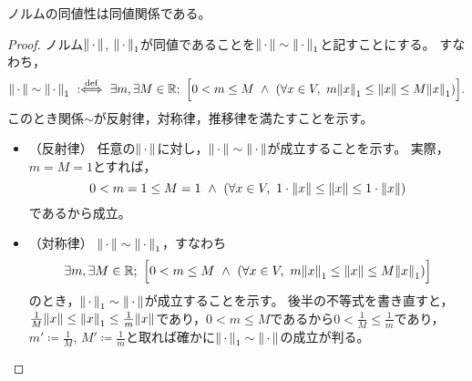 \documentclass[b5paper,draft]{ltjsbook}
\begin{document}
\begin{prop}
    ノルムの同値性は同値関係である。
    \begin{proof}
        ノルム$\norm{\dummy}$, $\norm{\dummy}_1$が同値であることを$\norm{\dummy}\sim\norm{\dummy}_1$と記すことにする。
        すなわち，
        \begin{equation}
            \norm{\dummy}\sim\norm{\dummy}_1\ \defarrow\ \exists m, \exists M\in\R;\ \bsqu{0<m\leq M\ \land \ \pare{
                \forall x\in V,\ m\norm{x}_1 \leq \norm{x} \leq M\norm{x}_1
            }}.
        \end{equation}
        このとき関係$\sim$が反射律，対称律，推移律を満たすことを示す。
        \begin{itemize}
            \item （反射律）
            任意の$\norm{\dummy}$に対し，$\norm{\dummy}\sim\norm{\dummy}$が成立することを示す。
            実際，$m=M=1$とすれば，
            \begin{equation}
                0<m=1\leq M=1\ \land\ \pare{\forall x\in V,\ 1\cdot \norm{x}\leq \norm{x}\leq 1\cdot \norm{x}}
            \end{equation}
            であるから成立。

            \item （対称律）
            $\norm{\dummy}\sim\norm{\dummy}_1$，すなわち
            \begin{equation}
                \exists m, \exists M\in\R;\ \bsqu{0<m\leq M\ \land \ \pare{
                \forall x\in V,\ m\norm{x}_1 \leq \norm{x} \leq M\norm{x}_1
                }}
            \end{equation}
            のとき，$\norm{\dummy}_1\sim\norm{\dummy}$が成立することを示す。
            後半の不等式を書き直すと，$\frac{1}{M}\norm{x}\leq \norm{x}_1\leq \frac{1}{m}\norm{x}$であり，$0<m\leq M$であるから$0<\frac{1}{M}\leq \frac{1}{m}$であり，$m' \coloneqq \frac{1}{M}$, $M' \coloneqq  \frac{1}{m}$と取れば確かに$\norm{\dummy}_1\sim\norm{\dummy}$の成立が判る。


\end{itemize}
\end{proof}
\end{prop}
\end{document}
